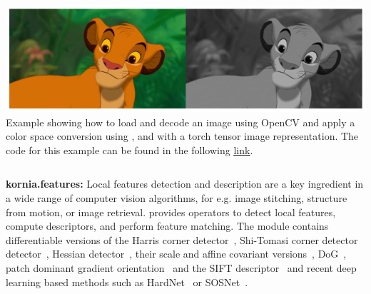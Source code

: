 \vspace{.5cm}

\begin{tcolorbox}[every float=\centering, drop shadow, title=Example 2: Color Space Conversion]
    \label{fig:examples:color}
    \includegraphics[width=1.\linewidth]{main/chapter03/data/examples/color_simba.jpg}
    {Example showing how to load and decode an image using OpenCV and apply a color space conversion using \lib{}, and with a torch tensor image representation. The code for this example can be found in the following \underline{\color{blue}\href{https://colab.research.google.com/drive/1dgT9-QLZiTjxPK9Ej4YnyV953uTQKBCm}{link}}.}
    \inputminted[python3, baselinestretch=1., style=vs, fontfamily=courier, fontsize=\footnotesize, funcnamehighlighting=true]{python}{main/chapter03/data/examples/snipet_color.py}
\end{tcolorbox}

\newpage

\noindent\textbf{kornia.features:} Local features detection and description are a key ingredient in a wide range of computer vision algorithms, for e.g. image stitching, structure from motion, or image retrieval. \lib{} provides operators to detect local features, compute descriptors, and perform feature matching. The module contains differentiable versions of the Harris corner detector~\citep{Harris88}, Shi-Tomasi corner detector detector~\citep{Shi94goodfeatures}, Hessian detector~\citep{Hessian78}, their scale and affine covariant versions~\citep{Mikolajczyk2004}, DoG~\citep{Lowe2004}, patch dominant gradient orientation~\citep{Lowe2004} and the SIFT descriptor~\citep{Lowe2004} and recent deep learning based methods such as HardNet~\citep{mishchuk2017working} or SOSNet~\citep{tian2019sosnet}. %

